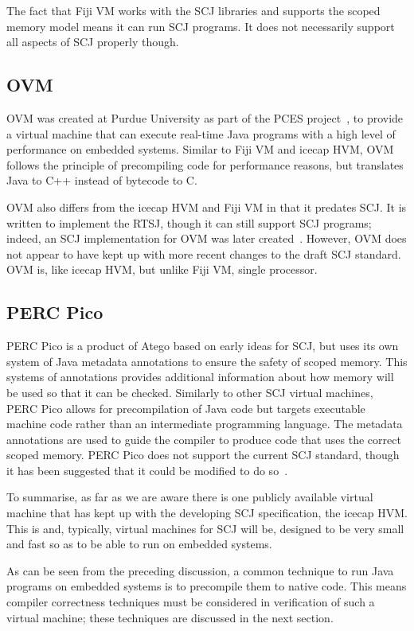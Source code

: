 \documentclass[a4paper,10pt]{report}
\begin{document}
The fact that Fiji VM works with the SCJ libraries and supports the scoped
memory model means it can run SCJ programs.  It does not necessarily support all
aspects of SCJ properly though.

\subsection{OVM}

OVM was created at Purdue University as part of the PCES
project~\cite{baker2006}, to provide a virtual machine that can execute
real-time Java programs with a high level of performance on embedded systems.
Similar to Fiji VM and icecap HVM, OVM follows the principle of precompiling
code for performance reasons, but translates Java to C++ instead of bytecode to
C.

OVM also differs from the icecap HVM and Fiji VM in that it predates SCJ. It is
written to implement the RTSJ, though it can still support SCJ programs; indeed,
an SCJ implementation for OVM was later created~\cite{plsek2010}. However, OVM
does not appear to have kept up with more recent changes to the draft SCJ
standard. OVM is, like icecap HVM, but unlike Fiji VM, single processor.

\subsection{PERC Pico}

PERC Pico is a product of Atego based on early ideas for SCJ, but uses its own
system of Java metadata annotations to ensure the safety of scoped memory.  This
systems of annotations provides additional information about how memory will be
used so that it can be checked.  Similarly to other SCJ virtual machines, PERC
Pico allows for precompilation of Java code but targets executable machine code
rather than an intermediate programming language.  The metadata annotations are
used to guide the compiler to produce code that uses the correct scoped memory.
PERC Pico does not support the current SCJ standard, though it has been
suggested that it could be modified to do so~\cite{nilsen2011}.

To summarise, as far as we are aware there is one publicly available virtual
machine that has kept up with the developing SCJ specification, the icecap
HVM. This is and, typically, virtual machines for SCJ will be, designed to be
very small and fast so as to be able to run on embedded systems.

As can be seen from the preceding discussion, a common technique to run Java
programs on embedded systems is to precompile them to native code. This means
compiler correctness techniques must be considered in verification of such a
virtual machine; these techniques are discussed in the next section.
\end{document}
